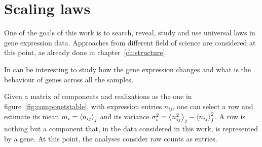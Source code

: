 \chapter{Scaling laws}\label{ch:scalinglaws}
One of the goals of this work is to search, reveal, study and use universal laws in gene expression data. Approaches from different field of science are considered at this point, as already done in chapter~\ref{ch:structure}.~\nocite{altmann2016statistical}

In can be interesting to study how the gene expression changes and what is the behaviour of genes across all the samples.

Given a matrix of components and realizations as the one in figure~\ref{fig:componetstable}, with expression entries $n_{i j}$, one can select a row and estimate its mean $m_i=\left\langle n_{i
 j}\right\rangle_j$ and its variance $\sigma^2_{i}=\left\langle n_{i j}^2\right\rangle_j - \left\langle n_{i j}\right\rangle^2_j$. A row is nothing but a component that, in the data considered in this work, is represented by a gene. At this point, the analyses consider raw counts as entries.  


\clearpage

\FloatBarrier
